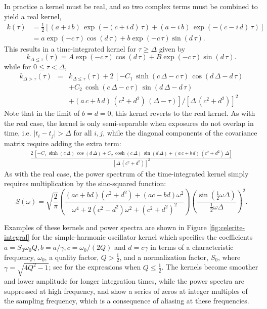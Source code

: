 \documentclass[modern]{aastex62}
\begin{document}
In practice a kernel must be real, and so two complex terms must be
combined to yield a real kernel,
\begin{align}
k(\tau) &= \tfrac{1}{2}\left[(a + i\,b)\,\exp\left(-(c+i\,d)\,\tau\right)+ (a - i\,b)\,\exp\left(-(c-i\,d)\,\tau\right) \right]\\
&= a \exp\left(-c\,\tau\right)\cos\left(d\,\tau\right) + b \exp\left(-c\,\tau\right)\sin\left(d\,\tau\right).
\end{align}
This results in a time-integrated kernel for $\tau \ge \Delta$ given by
\begin{equation}
k_{\Delta\le\tau}(\tau) = A\exp\left(-c\,\tau\right)\cos\left(d\,\tau\right) + B\exp\left(-c\,\tau\right)\sin\left(d\,\tau\right).
\end{equation}
while for $0 \le \tau < \Delta$,
\begin{eqnarray}
k_{\Delta>\tau}(\tau) &=& k_{\Delta\le\tau}(\tau) + 2\,\left[
  - C_1\,\sinh(c\,\Delta-c\,\tau)\,\cos(d\,\Delta-d\,\tau) \right. \nonumber\\
&&  + C_2\,\cosh(c\,\Delta-c\,\tau)\,\sin(d\,\Delta-d\,\tau) \nonumber \\
&&  \left. + (a\,c + b\,d)\,(c^2 + d^2)\,(\Delta-\tau)\right] / [\Delta\,(c^2+d^2)]^2
\end{eqnarray}
Note that in the limit of $b = d = 0$, this kernel reverts to the real kernel.
As with the real case, the kernel is only semi-separable when exposures
do not overlap in time, i.e. $\vert t_i - t_j \vert > \Delta$ for all $i,j$, while the diagonal
components of the covariance matrix require adding the extra term:
\begin{eqnarray}
  \frac{2\,\left[
    - C_1\,\sinh(c\,\Delta)\,\cos(d\,\Delta) + C_2\,\cosh(c\,\Delta)\,\sin(d\,\Delta) + (a\,c + b\,d)\,(c^2 + d^2)\,\Delta\right]}{[\Delta\,(c^2+d^2)]^2}
\end{eqnarray}
As with the real case, the power spectrum of the time-integrated kernel simply
requires multiplication by the sinc-squared function:
\begin{equation}
S(\omega) = \sqrt{\frac{2}{\pi}} \left(\frac{(ac+bd)(c^2+d^2)+(ac-bd)\omega^2}
{\omega^4+2(c^2-d^2)\omega^2+(c^2+d^2)^2}\right)
\left( \frac{\sin(\tfrac{1}{2}\omega \Delta)}{\tfrac{1}{2}\omega\Delta}\right)^2.
\end{equation}

Examples of these kernels and power spectra are shown in Figure \ref{fig:celerite-integral}
for the simple-harmonic oscillator kernel which specifies the coefficients
$a = S_0\omega_0 Q, b=a/\gamma, c=\omega_0/(2Q)$ and $d=c\gamma$ in terms of a characteristic
frequency, $\omega_0$, a quality factor, $Q > \tfrac{1}{2}$, and a normalization
factor, $S_0$, where $\gamma = \sqrt{4Q^2-1}$;  see \citet{Foreman-Mackey:2017} for the
expressions when $Q \le \tfrac{1}{2}$.
The kernels become smoother and lower amplitude for longer integration times,
while the power spectra are suppressed at high frequency, and show a series of
zeros at integer multiples of the sampling frequency, which is a consequence
of aliasing at these frequencies.
\end{document}
